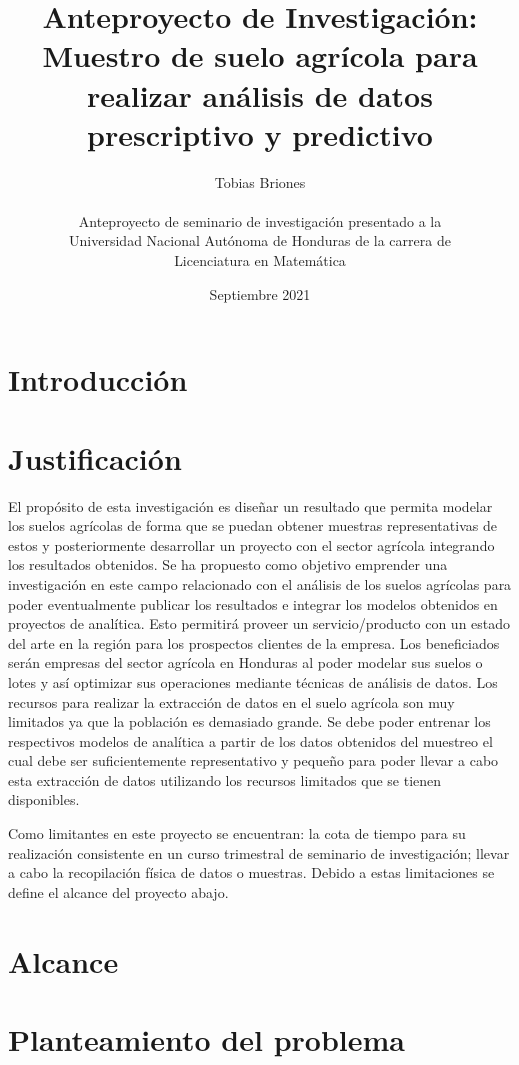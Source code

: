 \documentclass{report}
\title{Anteproyecto de Investigación: Muestro de suelo agrícola para realizar análisis de datos prescriptivo y predictivo}
\author{
Tobias Briones\\\\
Anteproyecto de seminario de investigación presentado a la\\
Universidad Nacional Autónoma de Honduras de la carrera de\\
Licenciatura en Matemática
}
\date{Septiembre 2021}
\begin{document}
\maketitle

\tableofcontents


\section{Introducción}


\section{Justificación}

El propósito de esta investigación es diseñar un resultado que permita modelar los suelos agrícolas de forma que se puedan obtener muestras representativas de estos y posteriormente desarrollar un proyecto con el sector agrícola integrando los resultados obtenidos. Se ha propuesto como objetivo emprender una investigación en este campo relacionado con el análisis de los suelos agrícolas para poder eventualmente publicar los resultados e integrar los modelos obtenidos en proyectos de analítica. Esto permitirá proveer un servicio/producto con un estado del arte en la región para los prospectos clientes de la empresa. Los beneficiados serán empresas del sector agrícola en Honduras al poder modelar sus suelos o lotes y así optimizar sus operaciones mediante técnicas de análisis de datos. Los recursos para realizar la extracción de datos en el suelo agrícola son muy limitados ya que la población es demasiado grande. Se debe poder entrenar los respectivos modelos de analítica a partir de los datos obtenidos del muestreo el cual debe ser suficientemente representativo y pequeño para poder llevar a cabo esta extracción de datos utilizando los recursos limitados que se tienen disponibles.

\bigbreak

Como limitantes en este proyecto se encuentran: la cota de tiempo para su realización consistente en un curso trimestral de seminario de investigación; llevar a cabo la recopilación física de datos o muestras. Debido a estas limitaciones se define el alcance del proyecto abajo.

\section{Alcance}

\section{Planteamiento del problema}
\end{document}
